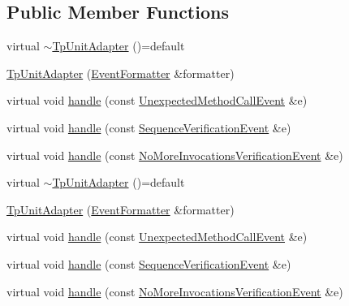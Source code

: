 \subsection*{Public Member Functions}
\begin{DoxyCompactItemize}
\item 
virtual \mbox{\hyperlink{classfakeit_1_1TpUnitAdapter_a09ff2fc50077f22a68bfcd760ac6a8f1}{$\sim$\+Tp\+Unit\+Adapter}} ()=default
\item 
\mbox{\hyperlink{classfakeit_1_1TpUnitAdapter_a559b5a1a37c7665d93e3c1b2e0b990cf}{Tp\+Unit\+Adapter}} (\mbox{\hyperlink{structfakeit_1_1EventFormatter}{Event\+Formatter}} \&formatter)
\item 
virtual void \mbox{\hyperlink{classfakeit_1_1TpUnitAdapter_a9cdbf4f7a4a277d5b49740929fd8d2c7}{handle}} (const \mbox{\hyperlink{structfakeit_1_1UnexpectedMethodCallEvent}{Unexpected\+Method\+Call\+Event}} \&e)
\item 
virtual void \mbox{\hyperlink{classfakeit_1_1TpUnitAdapter_a9c4c39c5532828c1f37acc9b430623ee}{handle}} (const \mbox{\hyperlink{structfakeit_1_1SequenceVerificationEvent}{Sequence\+Verification\+Event}} \&e)
\item 
virtual void \mbox{\hyperlink{classfakeit_1_1TpUnitAdapter_a49b90d34b82077f5904406b7954e55e9}{handle}} (const \mbox{\hyperlink{structfakeit_1_1NoMoreInvocationsVerificationEvent}{No\+More\+Invocations\+Verification\+Event}} \&e)
\item 
virtual \mbox{\hyperlink{classfakeit_1_1TpUnitAdapter_a09ff2fc50077f22a68bfcd760ac6a8f1}{$\sim$\+Tp\+Unit\+Adapter}} ()=default
\item 
\mbox{\hyperlink{classfakeit_1_1TpUnitAdapter_a559b5a1a37c7665d93e3c1b2e0b990cf}{Tp\+Unit\+Adapter}} (\mbox{\hyperlink{structfakeit_1_1EventFormatter}{Event\+Formatter}} \&formatter)
\item 
virtual void \mbox{\hyperlink{classfakeit_1_1TpUnitAdapter_a9cdbf4f7a4a277d5b49740929fd8d2c7}{handle}} (const \mbox{\hyperlink{structfakeit_1_1UnexpectedMethodCallEvent}{Unexpected\+Method\+Call\+Event}} \&e)
\item 
virtual void \mbox{\hyperlink{classfakeit_1_1TpUnitAdapter_a9c4c39c5532828c1f37acc9b430623ee}{handle}} (const \mbox{\hyperlink{structfakeit_1_1SequenceVerificationEvent}{Sequence\+Verification\+Event}} \&e)
\item 
virtual void \mbox{\hyperlink{classfakeit_1_1TpUnitAdapter_a49b90d34b82077f5904406b7954e55e9}{handle}} (const \mbox{\hyperlink{structfakeit_1_1NoMoreInvocationsVerificationEvent}{No\+More\+Invocations\+Verification\+Event}} \&e)
\end{DoxyCompactItemize}


